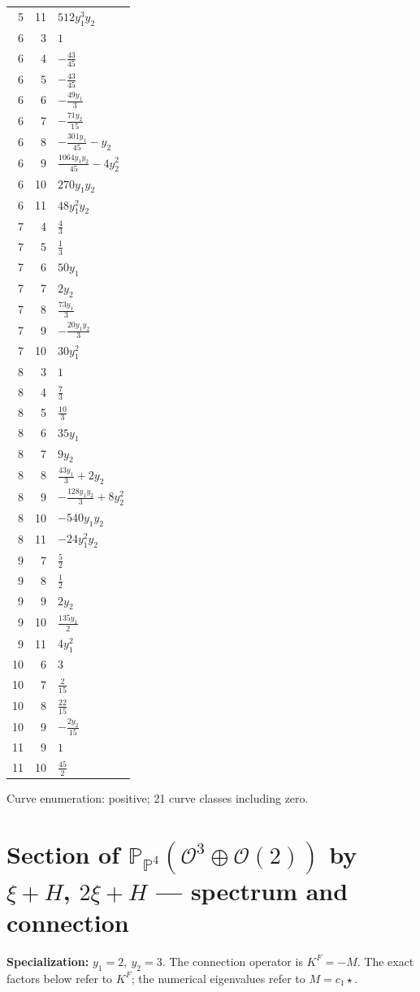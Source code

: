 \documentclass[10pt,a4paper]{article}
\begin{document}
{\begin{longtable}{rrp{125mm}}
5 & 11 & $512 y_{1}^{3} y_{2}$\\
6 & 3 & $1$\\
6 & 4 & $- \frac{43}{45}$\\
6 & 5 & $- \frac{43}{45}$\\
6 & 6 & $- \frac{49 y_{1}}{3}$\\
6 & 7 & $- \frac{71 y_{2}}{15}$\\
6 & 8 & $- \frac{301 y_{1}}{45} - y_{2}$\\
6 & 9 & $\frac{1064 y_{1} y_{2}}{45} - 4 y_{2}^{2}$\\
6 & 10 & $270 y_{1} y_{2}$\\
6 & 11 & $48 y_{1}^{2} y_{2}$\\
7 & 4 & $\frac{4}{3}$\\
7 & 5 & $\frac{1}{3}$\\
7 & 6 & $50 y_{1}$\\
7 & 7 & $2 y_{2}$\\
7 & 8 & $\frac{73 y_{1}}{3}$\\
7 & 9 & $- \frac{20 y_{1} y_{2}}{3}$\\
7 & 10 & $30 y_{1}^{2}$\\
8 & 3 & $1$\\
8 & 4 & $\frac{7}{3}$\\
8 & 5 & $\frac{10}{3}$\\
8 & 6 & $35 y_{1}$\\
8 & 7 & $9 y_{2}$\\
8 & 8 & $\frac{43 y_{1}}{3} + 2 y_{2}$\\
8 & 9 & $- \frac{128 y_{1} y_{2}}{3} + 8 y_{2}^{2}$\\
8 & 10 & $- 540 y_{1} y_{2}$\\
8 & 11 & $- 24 y_{1}^{2} y_{2}$\\
9 & 7 & $\frac{5}{2}$\\
9 & 8 & $\frac{1}{2}$\\
9 & 9 & $2 y_{2}$\\
9 & 10 & $\frac{135 y_{1}}{2}$\\
9 & 11 & $4 y_{1}^{2}$\\
10 & 6 & $3$\\
10 & 7 & $\frac{2}{15}$\\
10 & 8 & $\frac{22}{15}$\\
10 & 9 & $- \frac{2 y_{2}}{15}$\\
11 & 9 & $1$\\
11 & 10 & $\frac{45}{2}$\\
\end{longtable}}
Curve enumeration: positive; 21 curve classes including zero.
\clearpage\section*{Section of $\mathbb P_{\mathbb P^{4}}(\mathcal O^{3}\oplus \mathcal O(2))$ by $\xi +H$, $2\xi +H$ --- spectrum and connection}
\textbf{Specialization:} $y_1=2,\ y_2=3$. The connection operator is $K^F=-M$. The exact factors below refer to $K^F$; the numerical eigenvalues refer to $M=c_1\star$.
\end{document}
